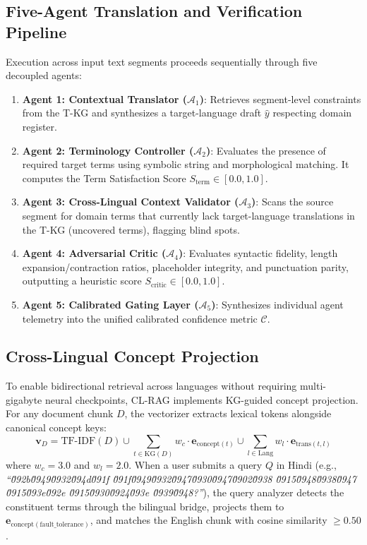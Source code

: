\documentclass[conference]{IEEEtran}
\begin{document}
\subsection{Five-Agent Translation and Verification Pipeline}
Execution across input text segments proceeds sequentially through five decoupled agents:

\begin{enumerate}
    \item \textbf{Agent 1: Contextual Translator ($\mathcal{A}_1$)}: Retrieves segment-level constraints from the T-KG and synthesizes a target-language draft $\hat{y}$ respecting domain register.
    \item \textbf{Agent 2: Terminology Controller ($\mathcal{A}_2$)}: Evaluates the presence of required target terms using symbolic string and morphological matching. It computes the Term Satisfaction Score $S_{\text{term}} \in [0.0, 1.0]$.
    \item \textbf{Agent 3: Cross-Lingual Context Validator ($\mathcal{A}_3$)}: Scans the source segment for domain terms that currently lack target-language translations in the T-KG (uncovered terms), flagging blind spots.
    \item \textbf{Agent 4: Adversarial Critic ($\mathcal{A}_4$)}: Evaluates syntactic fidelity, length expansion/contraction ratios, placeholder integrity, and punctuation parity, outputting a heuristic score $S_{\text{critic}} \in [0.0, 1.0]$.
    \item \textbf{Agent 5: Calibrated Gating Layer ($\mathcal{A}_5$)}: Synthesizes individual agent telemetry into the unified calibrated confidence metric $\mathcal{C}$.
\end{enumerate}

\subsection{Cross-Lingual Concept Projection}
To enable bidirectional retrieval across languages without requiring multi-gigabyte neural checkpoints, CL-RAG implements KG-guided concept projection. For any document chunk $D$, the vectorizer extracts lexical tokens alongside canonical concept keys:
\begin{equation}
\mathbf{v}_D = \text{TF-IDF}(D) \cup \sum_{t \in \text{KG}(D)} w_c \cdot \mathbf{e}_{\text{concept}(t)} \cup \sum_{l \in \text{Lang}} w_l \cdot \mathbf{e}_{\text{trans}(t, l)}
\end{equation}
where $w_c = 3.0$ and $w_l = 2.0$. When a user submits a query $Q$ in Hindi (e.g., \textit{``\u092b\u0949\u0932\u094d\u091f \u091f\u0949\u0932\u0947\u0930\u0947\u0902\u0938 \u0915\u0948\u0938\u0947 \u0915\u093e\u092e \u0915\u0930\u0924\u093e \u0939\u0948?''}), the query analyzer detects the constituent terms through the bilingual bridge, projects them to $\mathbf{e}_{\text{concept}(\text{fault\_tolerance})}$, and matches the English chunk with cosine similarity $\ge 0.50$.
\end{document}
